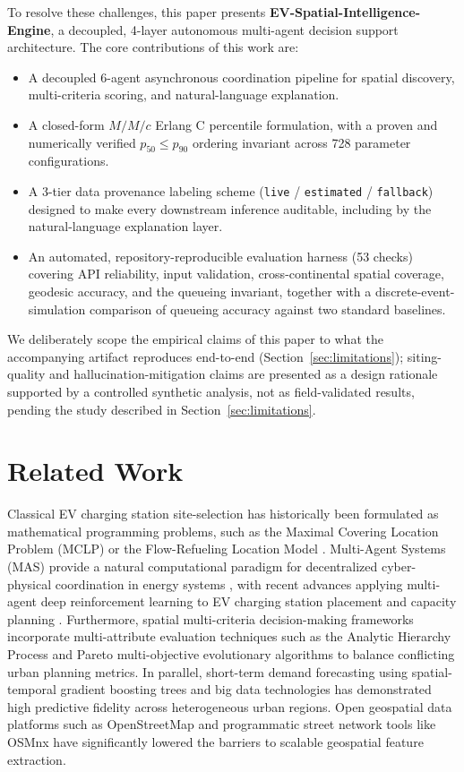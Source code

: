 \documentclass[preprint,12pt,authoryear]{elsarticle}
\begin{document}
To resolve these challenges, this paper presents \textbf{EV-Spatial-Intelligence-Engine}, a decoupled, 4-layer autonomous multi-agent decision support architecture. The core contributions of this work are:
\begin{itemize}
    \item A decoupled 6-agent asynchronous coordination pipeline for spatial discovery, multi-criteria scoring, and natural-language explanation.
    \item A closed-form $M/M/c$ Erlang C percentile formulation, with a proven and numerically verified $p_{50}\le p_{90}$ ordering invariant across 728 parameter configurations.
    \item A 3-tier data provenance labeling scheme (\texttt{live} / \texttt{estimated} / \texttt{fallback}) designed to make every downstream inference auditable, including by the natural-language explanation layer.
    \item An automated, repository-reproducible evaluation harness (53 checks) covering API reliability, input validation, cross-continental spatial coverage, geodesic accuracy, and the queueing invariant, together with a discrete-event-simulation comparison of queueing accuracy against two standard baselines.
\end{itemize}
We deliberately scope the empirical claims of this paper to what the accompanying artifact reproduces end-to-end (Section~\ref{sec:limitations}); siting-quality and hallucination-mitigation claims are presented as a design rationale supported by a controlled synthetic analysis, not as field-validated results, pending the study described in Section~\ref{sec:limitations}.

\section{Related Work}
\label{sec:related}
Classical EV charging station site-selection has historically been formulated as mathematical programming problems, such as the Maximal Covering Location Problem (MCLP) or the Flow-Refueling Location Model \citep{kempton2005electric}. Multi-Agent Systems (MAS) provide a natural computational paradigm for decentralized cyber-physical coordination in energy systems \citep{morstyn2020multiagent}, with recent advances applying multi-agent deep reinforcement learning to EV charging station placement and capacity planning \citep{zhang2023multiagent}. Furthermore, spatial multi-criteria decision-making frameworks \citep{chen2024spatial} incorporate multi-attribute evaluation techniques such as the Analytic Hierarchy Process \citep{saaty1988analytic} and Pareto multi-objective evolutionary algorithms \citep{deb2002fast} to balance conflicting urban planning metrics. In parallel, short-term demand forecasting using spatial-temporal gradient boosting trees \citep{wang2023gradient} and big data technologies \citep{arias2016forecasting} has demonstrated high predictive fidelity across heterogeneous urban regions. Open geospatial data platforms such as OpenStreetMap \citep{haklay2008openstreetmap} and programmatic street network tools like OSMnx \citep{boeing2017osmnx} have significantly lowered the barriers to scalable geospatial feature extraction.
\end{document}
